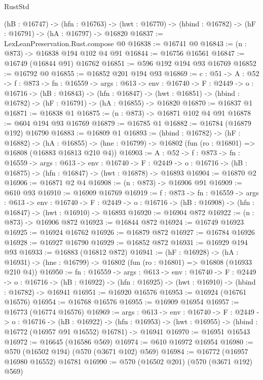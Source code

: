 \begin{lexlean}{RustStd}
\begin{coremodule}
  (hB : @16747) ->
  (hfn : @16763) -> (hwt : @16770) -> (hbind : @16782) -> (hF : @16791) -> (hA : @16797) -> @16820
@16837 := LexLeanPreservation.Rust.compose @0
@16838 := @16741 @0
@16843 := (n : @873) -> @16838 @194 @102 @4 @91
@16844 := @16756 @16561
@16847 := @16749 (@16844 @91) @16762
@16851 := @596 @192 @194 @93 @16769
@16852 := @16792 @0
@16855 := @16852 @201 @194 @93
@16869 := {c : @51} ->
  {A : @52} ->
  {f : @873} ->
  {fn : @16559} ->
  {args : @613} ->
  {env : @16740} ->
  {F : @2449} ->
  {o : @16716} ->
  (hB : @16843) ->
  (hfn : @16847) -> (hwt : @16851) -> (hbind : @16782) -> (hF : @16791) -> (hA : @16855) -> @16820
@16870 := @16837 @1
@16871 := @16838 @1
@16875 := (n : @873) -> @16871 @102 @4 @91
@16878 := @604 @194 @93 @16769
@16879 := @16785 @1
@16882 := @16784 (@16879 @192) @16790
@16883 := @16809 @1
@16893 := (hbind : @16782) ->
  (hF : @16882) ->
  (hA : @16855) -> (hne : @16799) -> @16802 (fun (ro : @16801) => @16808 (@16883 @16813 @210 @4))
@16903 := {A : @52} ->
  {f : @873} ->
  {fn : @16559} ->
  {args : @613} ->
  {env : @16740} ->
  {F : @2449} -> {o : @16716} -> (hB : @16875) -> (hfn : @16847) -> (hwt : @16878) -> @16893
@16904 := @16870 @2
@16906 := @16871 @2 @4
@16908 := (n : @873) -> @16906 @91
@16909 := @610 @93
@16910 := @16909 @16769
@16919 := {f : @873} ->
  {fn : @16559} ->
  {args : @613} ->
  {env : @16740} ->
  {F : @2449} -> {o : @16716} -> (hB : @16908) -> (hfn : @16847) -> (hwt : @16910) -> @16893
@16920 := @16904 @872
@16922 := (n : @873) -> @16906 @872
@16923 := @16844 @872
@16924 := @16749 @16923
@16925 := @16924 @16762
@16926 := @16879 @872
@16927 := @16784 @16926
@16928 := @16927 @16790
@16929 := @16852 @872
@16931 := @16929 @194 @93
@16933 := @16883 (@16812 @872)
@16941 := (hF : @16928) ->
  (hA : @16931) -> (hne : @16799) -> @16802 (fun (ro : @16801) => @16808 (@16933 @210 @4))
@16950 := {fn : @16559} ->
  {args : @613} ->
  {env : @16740} ->
  {F : @2449} ->
  {o : @16716} -> (hB : @16922) -> (hfn : @16925) -> (hwt : @16910) -> (hbind : @16782) -> @16941
@16951 := @16920 @16576
@16953 := @16924 (@16761 @16576)
@16954 := @16768 @16576
@16955 := @16909 @16954
@16957 := @16773 (@16774 @16576)
@16969 := {args : @613} ->
  {env : @16740} ->
  {F : @2449} ->
  {o : @16716} ->
  (hB : @16922) ->
  (hfn : @16953) -> (hwt : @16955) -> (hbind : @16772 (@16957 @91 @16552) @16781) -> @16941
@16970 := @16951 @16543
@16972 := @16645 (@16586 @569)
@16974 := @610 @16972 @16954
@16980 := @570 (@16502 @194) (@570 (@3671 @102) @569)
@16984 := @16772 (@16957 @16980 @16552) @16781
@16990 := @570 (@16502 @201) (@570 (@3671 @192) @569)

\end{coremodule}
\end{lexlean}
